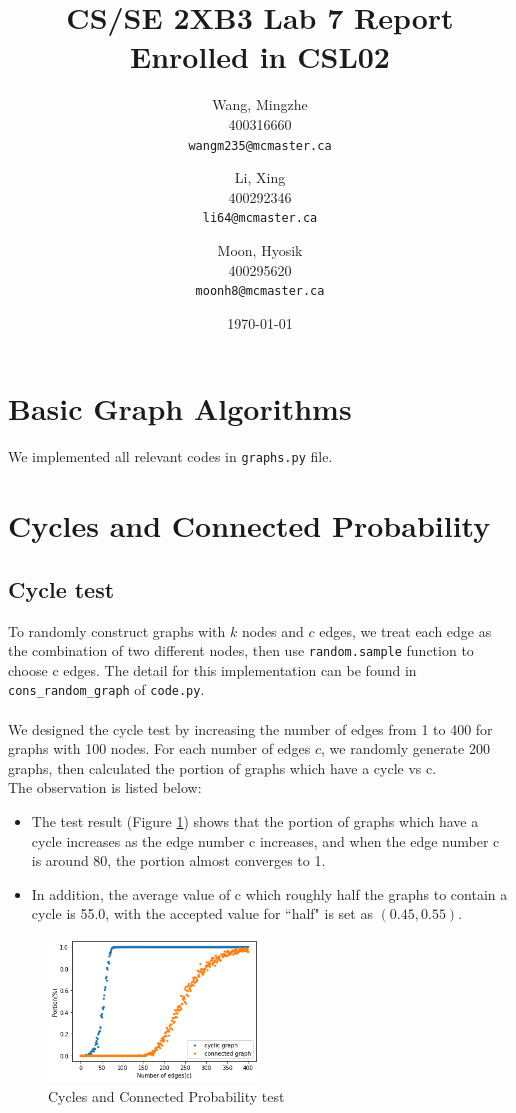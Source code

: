 \documentclass[12pt]{article}
\title{CS/SE 2XB3 Lab 7 Report\\Enrolled in CSL02}
\author{
  Wang, Mingzhe\\400316660\\
  \texttt{wangm235@mcmaster.ca}
  \and
  Li, Xing\\400292346\\
  \texttt{li64@mcmaster.ca}
  \and
  Moon, Hyosik\\400295620\\
  \texttt{moonh8@mcmaster.ca}
  }
\date{\today}
\begin{document}
\maketitle

\tableofcontents
\newpage

\section{Basic Graph Algorithms}
We implemented all relevant codes in \verb|graphs.py| file.

\bigskip

\section{Cycles and Connected Probability}

\subsection{Cycle test}
To randomly construct graphs with $k$ nodes and $c$ edges, we treat each edge as the combination of two different nodes, then use \verb|random.sample| function to choose c edges. The detail for this implementation can be found in \verb|cons_random_graph| of \verb|code.py|.\\\\
We designed the cycle test by increasing the number of edges from 1 to 400 for graphs with 100 nodes. For each number of edges $c$, we randomly generate 200 graphs, then calculated the portion of  graphs which have a cycle vs c.\\

\noindent
The observation is listed below:
\begin{itemize}
\item The test result (Figure \ref{graph_test}) shows that the portion of graphs which have a cycle increases as the edge number c increases, and when the edge number c is around 80, the portion almost converges to 1. 
\item In addition, the average value of c which roughly half the graphs to contain a cycle is 55.0, with the accepted value for ``half" is set as $(0.45, 0.55)$.
\end{itemize}

\begin{figure}[hbt!]
  \centering
  \includegraphics[width=0.5\textwidth]{Figures/graph_test.png}
  \caption{Cycles and Connected Probability test}
   \label{graph_test}
\end{figure}
\end{document}
